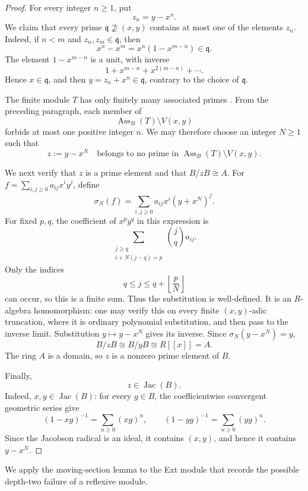 \documentclass[reqno]{amsart}
\theoremstyle{plain}
\theoremstyle{definition}
\newcommand{\Ass}{\operatorname{Ass}}
\newcommand{\Jac}{\operatorname{Jac}}
\begin{document}
\begin{proof}

For every integer $n\geq1$, put
\[
 z_n=y-x^n.
\]
We claim that every prime $\mathfrak q\not\supseteq(x,y)$ contains at most
one of the elements $z_n$.  Indeed, if $n<m$ and $z_n,z_m\in\mathfrak q$,
then
\[
 x^n-x^m=x^n(1-x^{m-n})\in\mathfrak q.
\]
The element $1-x^{m-n}$ is a unit, with inverse
\[
 1+x^{m-n}+x^{2(m-n)}+\cdots.
\]
Hence $x\in\mathfrak q$, and then $y=z_n+x^n\in\mathfrak q$, contrary
to the choice of $\mathfrak q$.

The finite module $T$ has only finitely many associated primes
\cite[Chapter~IV, \S1, no.~4, Theorems~1--2 and
Corollary]{BourbakiCA}.  From
the preceding paragraph, each member of
\[
 \Ass_B(T)\setminus V(x,y)
\]
forbids at most one positive integer $n$.  We may therefore choose an
integer $N\geq1$ such that
\[
 z:=y-x^N
 \quad\text{belongs to no prime in }
 \Ass_B(T)\setminus V(x,y).
\]

We next verify that $z$ is a prime element and that $B/zB\cong A$.
For $f=\sum_{i,j\geq0}a_{ij}x^iy^j$, define
\[
 \sigma_N(f)=\sum_{i,j\geq0}a_{ij}x^i(y+x^N)^j.
\]
For fixed $p,q$, the coefficient of $x^py^q$ in this expression is
\[
 \sum_{\substack{j\geq q\\i+N(j-q)=p}}
 \binom jq a_{ij}.
\]
Only the indices
\[
 q\leq j\leq q+\left\lfloor\frac pN\right\rfloor
\]
can occur, so this is a finite sum.  Thus the substitution is well-defined.
It is an $R$-algebra homomorphism: one may verify this on every finite
$(x,y)$-adic truncation, where it is ordinary polynomial substitution, and
then pass to the inverse limit.  Substitution $y\mapsto y-x^N$ gives its
inverse.  Since $\sigma_N(y-x^N)=y$,
\begin{equation}
\label{eq:section-quotient}
 B/zB\cong B/yB\cong R[[x]]=A.
\end{equation}
The ring $A$ is a domain, so $z$ is a nonzero prime element of $B$.

Finally,
\[
 z\in\Jac(B).
\]
Indeed, $x,y\in\Jac(B)$: for every $g\in B$, the coefficientwise
convergent geometric series give
\[
 (1-xg)^{-1}=\sum_{n\geq0}(xg)^n,
 \qquad
 (1-yg)^{-1}=\sum_{n\geq0}(yg)^n.
\]
Since the Jacobson radical is an ideal, it contains $(x,y)$, and hence it
contains $y-x^N$.
\end{proof}

We apply the moving-section lemma to the Ext module that records the
possible depth-two failure of a reflexive module.
\end{document}
